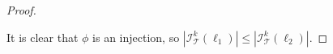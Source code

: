 \documentclass[11pt]{article}
\theoremstyle{definition}
\begin{document}
\begin{proof}
\begin{enumerate}
\end{enumerate}
It is clear that $\phi$ is an injection, so $|\mathcal{I}_{\mathcal{T}}^{k}(\ell_1)| \le |\mathcal{I}_{\mathcal{T}}^{k}(\ell_2)|$.
\end{proof}
\end{document}
